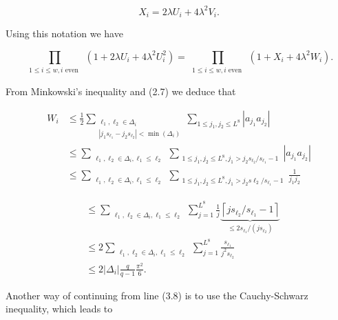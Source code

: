 \documentclass[10pt]{article}
\begin{document}
\begin{equation*}
X_{i}=2 \lambda U_{i}+4 \lambda^{2} V_{i} . \tag{3.7}
\end{equation*}


Using this notation we have

$$
\prod_{\substack{1 \leqslant i \leqslant w, i \text { even }}}\left(1+2 \lambda U_{i}+4 \lambda^{2} U_{i}^{2}\right)=\prod_{\substack{1 \leqslant i \leqslant w, i \text { even }}}\left(1+X_{i}+4 \lambda^{2} W_{i}\right) .
$$

From Minkowski's inequality and (2.7) we deduce that


\begin{align*}
W_{i} & \leqslant \frac{1}{2} \sum_{\substack{\ell_{1}, \ell_{2} \in \Delta_{i} \\
\left|j_{1} s_{\ell_{1}}-j_{2} s_{\ell_{2}}\right|<\min \left(\Delta_{i}\right)}} \sum_{1 \leqslant j_{1}, j_{2} \leqslant L^{8}}\left|a_{j_{1}} a_{j_{2}}\right| \\
& \leqslant \sum_{\substack{\ell_{1}, \ell_{2} \in \Delta_{i}, \ell_{1} \leqslant \ell_{2}}} \sum_{\substack{1 \leqslant j_{1}, j_{2} \leqslant L^{8}, j_{1}>j_{2} s_{\ell_{2}} / s_{\ell_{1}}-1}}\left|a_{j_{1}} a_{j_{2}}\right|  \tag{3.8}\\
& \leqslant \sum_{\substack{\ell_{1}, \ell_{2} \in \Delta_{i}, \ell_{1} \leqslant \ell_{2}}} \sum_{\substack{1 \leqslant j_{1}, j_{2} \leqslant L^{8}, j_{1}>j_{2} s \ell_{2} / s_{\ell_{1}}-1}} \frac{1}{j_{1} j_{2}}
\end{align*}


$$
\begin{aligned}
& \leqslant \sum_{\substack{\ell_{1}, \ell_{2} \in \Delta_{i}, \ell_{1} \leqslant \ell_{2}}} \sum_{j=1}^{L^{8}} \frac{1}{j} \underbrace{\left\lceil j s_{\ell_{2}} / s_{\ell_{1}}-1\right\rceil}_{\leqslant 2 s_{\ell_{1}} /\left(j s_{\ell_{2}}\right)} \\
& \leqslant 2 \sum_{\substack{\ell_{1}, \ell_{2} \in \Delta_{i}, \ell_{1} \leqslant \ell_{2}}} \sum_{j=1}^{L^{8}} \frac{s_{\ell_{1}}}{j^{2} s_{\ell_{2}}} \\
& \leqslant 2\left|\Delta_{i}\right| \frac{q}{q-1} \frac{\pi^{2}}{6} .
\end{aligned}
$$

Another way of continuing from line (3.8) is to use the Cauchy-Schwarz inequality, which leads to
\end{document}
